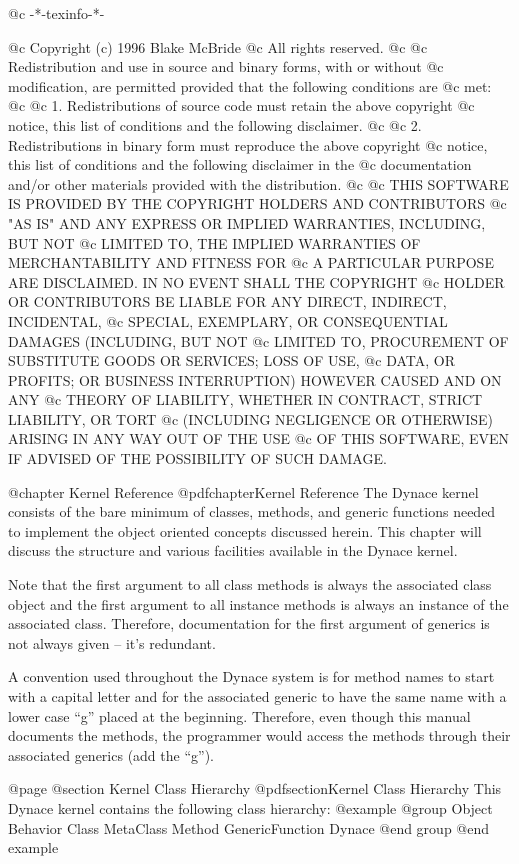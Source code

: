@c -*-texinfo-*-

@c  Copyright (c) 1996 Blake McBride
@c  All rights reserved.
@c
@c  Redistribution and use in source and binary forms, with or without
@c  modification, are permitted provided that the following conditions are
@c  met:
@c
@c  1. Redistributions of source code must retain the above copyright
@c  notice, this list of conditions and the following disclaimer.
@c
@c  2. Redistributions in binary form must reproduce the above copyright
@c  notice, this list of conditions and the following disclaimer in the
@c  documentation and/or other materials provided with the distribution.
@c
@c  THIS SOFTWARE IS PROVIDED BY THE COPYRIGHT HOLDERS AND CONTRIBUTORS
@c  "AS IS" AND ANY EXPRESS OR IMPLIED WARRANTIES, INCLUDING, BUT NOT
@c  LIMITED TO, THE IMPLIED WARRANTIES OF MERCHANTABILITY AND FITNESS FOR
@c  A PARTICULAR PURPOSE ARE DISCLAIMED. IN NO EVENT SHALL THE COPYRIGHT
@c  HOLDER OR CONTRIBUTORS BE LIABLE FOR ANY DIRECT, INDIRECT, INCIDENTAL,
@c  SPECIAL, EXEMPLARY, OR CONSEQUENTIAL DAMAGES (INCLUDING, BUT NOT
@c  LIMITED TO, PROCUREMENT OF SUBSTITUTE GOODS OR SERVICES; LOSS OF USE,
@c  DATA, OR PROFITS; OR BUSINESS INTERRUPTION) HOWEVER CAUSED AND ON ANY
@c  THEORY OF LIABILITY, WHETHER IN CONTRACT, STRICT LIABILITY, OR TORT
@c  (INCLUDING NEGLIGENCE OR OTHERWISE) ARISING IN ANY WAY OUT OF THE USE
@c  OF THIS SOFTWARE, EVEN IF ADVISED OF THE POSSIBILITY OF SUCH DAMAGE.

@chapter Kernel Reference
@pdfchapter{Kernel Reference}
The Dynace kernel consists of the bare minimum of classes, methods, and generic
functions needed to implement the object oriented concepts discussed herein.
This chapter will discuss the structure and various facilities available in
the Dynace kernel.

Note that the first argument to all class methods is always the
associated class object and the first argument to all instance methods
is always an instance of the associated class.  Therefore, documentation
for the first argument of generics is not always given -- it's redundant.

A convention used throughout the Dynace system is for method names to start
with a capital letter and for the associated generic to have the same
name with a lower case ``g'' placed at the beginning.  Therefore, even
though this manual documents the methods, the programmer would access
the methods through their associated generics (add the ``g'').

@page
@section Kernel Class Hierarchy
@pdfsection{Kernel Class Hierarchy}
This Dynace kernel contains the following class hierarchy:
@example
@group
     Object
          Behavior
               Class
               MetaClass
          Method
          GenericFunction
          Dynace
@end group
@end example

